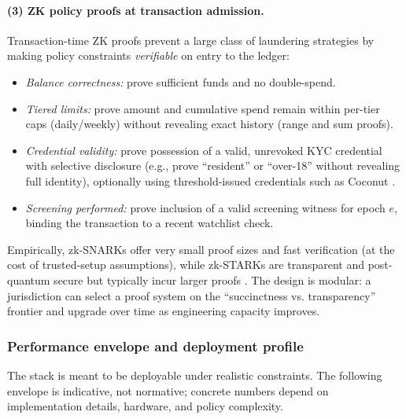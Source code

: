 \documentclass[11pt]{article}
\begin{document}
\paragraph{(3) ZK policy proofs at transaction admission.}
Transaction-time ZK proofs prevent a large class of laundering strategies by making policy constraints \emph{verifiable} on entry to the ledger:
\begin{itemize}
    \item \emph{Balance correctness:} prove sufficient funds and no double-spend.
    \item \emph{Tiered limits:} prove amount and cumulative spend remain within per-tier caps (daily/weekly) without revealing exact history (range and sum proofs).
    \item \emph{Credential validity:} prove possession of a valid, unrevoked KYC credential with selective disclosure (e.g., prove ``resident'' or ``over-18'' without revealing full identity), optionally using threshold-issued credentials such as Coconut \citep{Sonnino2019Coconut}.
    \item \emph{Screening performed:} prove inclusion of a valid screening witness for epoch $e$, binding the transaction to a recent watchlist check.
\end{itemize}

Empirically, zk-SNARKs offer very small proof sizes and fast verification (at the cost of trusted-setup assumptions), while zk-STARKs are transparent and post-quantum secure but typically incur larger proofs \citep{ElHajj2024ZKBench}. The design is modular: a jurisdiction can select a proof system on the ``succinctness vs. transparency'' frontier and upgrade over time as engineering capacity improves.

\subsubsection{Performance envelope and deployment profile}
\label{sec:pet-aml-performance}

The stack is meant to be deployable under realistic constraints. The following envelope is indicative, not normative; concrete numbers depend on implementation details, hardware, and policy complexity.
\end{document}
